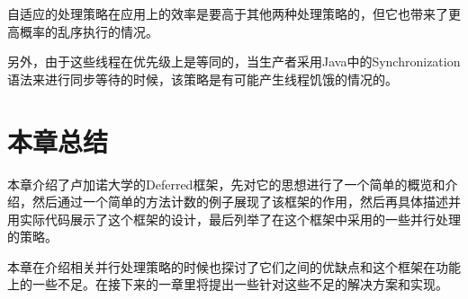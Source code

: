 自适应的处理策略在应用上的效率是要高于其他两种处理策略的，但它也带来了更高概率的乱序执行的情况。

另外，由于这些线程在优先级上是等同的，当生产者采用Java中的Synchronization语法来进行同步等待的时候，该策略是有可能产生线程饥饿的情况的。

\section{本章总结}

本章介绍了卢加诺大学的Deferred框架，先对它的思想进行了一个简单的概览和介绍，然后通过一个简单的方法计数的例子展现了该框架的作用，然后再具体描述并用实际代码展示了这个框架的设计，最后列举了在这个框架中采用的一些并行处理的策略。

本章在介绍相关并行处理策略的时候也探讨了它们之间的优缺点和这个框架在功能上的一些不足。在接下来的一章里将提出一些针对这些不足的解决方案和实现。

